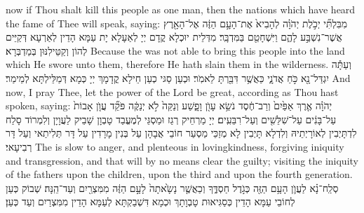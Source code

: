 {now if Thou shalt kill this people as one man, then the nations which have heard the fame of Thee will speak, saying:}{}
{מִבִּלְתִּ֞י יְכֹ֣לֶת יְהֹוָ֗ה לְהָבִיא֙ אֶת־הָעָ֣ם הַזֶּ֔ה אֶל־הָאָ֖רֶץ אֲשֶׁר־נִשְׁבַּ֣ע לָהֶ֑ם וַיִּשְׁחָטֵ֖ם בַּמִּדְבָּֽר׃
}
{מִדְּלֵית יוּכְלָא קֳדָם יְיָ לְאַעָלָא יָת עַמָּא הָדֵין לְאַרְעָא דְּקַיֵּים לְהוֹן וְקַטֵּילִנּוּן בְּמַדְבְּרָא׃}
{Because the \lord\space was not able to bring this people into the land which He swore unto them, therefore He hath slain them in the wilderness.}{}
{וְעַתָּ֕ה \large יִ\normalsize גְדַּל־נָ֖א כֹּ֣חַ אֲדֹנָ֑י כַּאֲשֶׁ֥ר דִּבַּ֖רְתָּ לֵאמֹֽר׃
}
{וּכְעַן סַגּי כְעַן חֵילָא קֳדָמָךְ יְיָ כְּמָא דְּמַלֵּילְתָּא לְמֵימַר׃}
{And now, I pray Thee, let the power of the Lord be great, according as Thou hast spoken, saying:}{}
{יְהֹוָ֗ה אֶ֤רֶךְ אַפַּ֙יִם֙ וְרַב־חֶ֔סֶד נֹשֵׂ֥א עָוֺ֖ן וָפָ֑שַׁע וְנַקֵּה֙ לֹ֣א יְנַקֶּ֔ה פֹּקֵ֞ד עֲוֺ֤ן אָבוֹת֙ עַל־בָּנִ֔ים עַל־שִׁלֵּשִׁ֖ים וְעַל־רִבֵּעִֽים׃
}
{יְיָ מַרְחֵיק רְגַז וּמַסְגֵּי לְמֶעֱבַד טָבְוָן שָׁבֵיק לַעֲוָיָן וְלִמְרוֹד סָלַח לִדְתָּיְבִין לְאוֹרָיְתֵיהּ וְלִדְלָא תָּיְבִין לָא מְזַכֵּי מַסְעַר חוֹבֵי אֲבָהָן עַל בְּנִין מָרָדִין עַל דָּר תְּלִיתַאי וְעַל דָּר רְבִיעָאי׃}
{The \lord\space is slow to anger, and plenteous in lovingkindness, forgiving iniquity and transgression, and that will by no means clear the guilty; visiting the iniquity of the fathers upon the children, upon the third and upon the fourth generation.}{}
{סְלַֽח־נָ֗א לַעֲוֺ֛ן הָעָ֥ם הַזֶּ֖ה כְּגֹ֣דֶל חַסְדֶּ֑ךָ וְכַאֲשֶׁ֤ר נָשָׂ֙אתָה֙ לָעָ֣ם הַזֶּ֔ה מִמִּצְרַ֖יִם וְעַד־הֵֽנָּה׃}
{שְׁבוֹק כְּעַן לְחוֹבֵי עַמָּא הָדֵין כְּסַגִּיאוּת טָבְוָתָךְ וּכְמָא דִּשְׁבַקְתָּא לְעַמָּא הָדֵין מִמִּצְרַיִם וְעַד כְּעַן׃}
